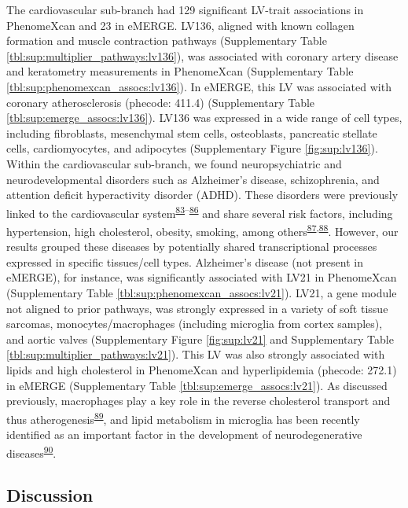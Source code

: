 \documentclass[
  a4paper,
]{article}
\begin{document}
The cardiovascular sub-branch had 129 significant LV-trait associations in PhenomeXcan and 23 in eMERGE.
LV136, aligned with known collagen formation and muscle contraction pathways (Supplementary Table \ref{tbl:sup:multiplier_pathways:lv136}), was associated with coronary artery disease and keratometry measurements in PhenomeXcan (Supplementary Table \ref{tbl:sup:phenomexcan_assocs:lv136}).
In eMERGE, this LV was associated with coronary atherosclerosis (phecode: 411.4) (Supplementary Table \ref{tbl:sup:emerge_assocs:lv136}).
LV136 was expressed in a wide range of cell types, including fibroblasts, mesenchymal stem cells, osteoblasts, pancreatic stellate cells, cardiomyocytes, and adipocytes (Supplementary Figure \ref{fig:sup:lv136}).
Within the cardiovascular sub-branch, we found neuropsychiatric and neurodevelopmental disorders such as Alzheimer's disease, schizophrenia, and attention deficit hyperactivity disorder (ADHD).
These disorders were previously linked to the cardiovascular system\textsuperscript{\protect\hyperlink{ref-10qjLoufR}{83}--\protect\hyperlink{ref-13t4TuFeJ}{86}} and share several risk factors, including hypertension, high cholesterol, obesity, smoking, among others\textsuperscript{\protect\hyperlink{ref-D83Aqhga}{87},\protect\hyperlink{ref-9BGyO071}{88}}.
However, our results grouped these diseases by potentially shared transcriptional processes expressed in specific tissues/cell types.
Alzheimer's disease (not present in eMERGE), for instance, was significantly associated with LV21 in PhenomeXcan (Supplementary Table \ref{tbl:sup:phenomexcan_assocs:lv21}).
LV21, a gene module not aligned to prior pathways, was strongly expressed in a variety of soft tissue sarcomas, monocytes/macrophages (including microglia from cortex samples), and aortic valves (Supplementary Figure \ref{fig:sup:lv21} and Supplementary Table \ref{tbl:sup:multiplier_pathways:lv21}).
This LV was also strongly associated with lipids and high cholesterol in PhenomeXcan and hyperlipidemia (phecode: 272.1) in eMERGE (Supplementary Table \ref{tbl:sup:emerge_assocs:lv21}).
As discussed previously, macrophages play a key role in the reverse cholesterol transport and thus atherogenesis\textsuperscript{\protect\hyperlink{ref-idlBgtFz}{89}}, and lipid metabolism in microglia has been recently identified as an important factor in the development of neurodegenerative diseases\textsuperscript{\protect\hyperlink{ref-18I4ish9s}{90}}.

\hypertarget{discussion}{%
\subsection{Discussion}\label{discussion}}
\end{document}
